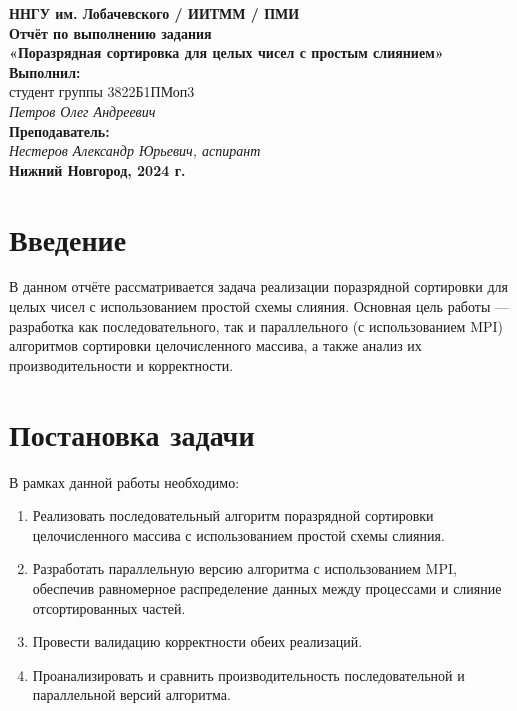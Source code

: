 \documentclass[12pt]{article}
\begin{document}

\begin{titlepage}
\begin{center}
\large
\textbf{ННГУ им. Лобачевского / ИИТММ / ПМИ}\\[0.5cm]

\vspace{4cm}
\textbf{\Large Отчёт по выполнению задания}\\
\textbf{\large «Поразрядная сортировка для целых чисел с простым слиянием»}\\[3cm]

\vspace{3cm}
\textbf{Выполнил:}\\
студент группы 3822Б1ПМоп3 \\
\textit{Петров Олег Андреевич}\\[1cm]

\textbf{Преподаватель:}\\
\textit{Нестеров Александр Юрьевич, аспирант}\\[2cm]

\vfill
\textbf{Нижний Новгород, 2024 г.}
\end{center}
\end{titlepage}

\tableofcontents
\newpage


\section*{Введение}

В данном отчёте рассматривается задача реализации поразрядной сортировки для целых чисел с использованием простой схемы слияния. Основная цель работы --- разработка как последовательного, так и параллельного (с использованием MPI) алгоритмов сортировки целочисленного массива, а также анализ их производительности и корректности.


\section{Постановка задачи}
В рамках данной работы необходимо:
\begin{enumerate}
\item Реализовать последовательный алгоритм поразрядной сортировки целочисленного массива с использованием простой схемы слияния.
\item Разработать параллельную версию алгоритма с использованием MPI, обеспечив равномерное распределение данных между процессами и слияние отсортированных частей.
\item Провести валидацию корректности обеих реализаций.
\item Проанализировать и сравнить производительность последовательной и параллельной версий алгоритма.
\end{enumerate}
\end{document}
